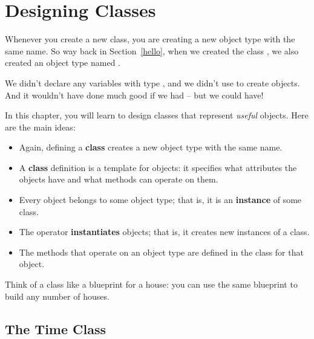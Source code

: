 \chapter{Designing Classes}


Whenever you create a new class, you are creating a new object type with the same name.
So way back in Section~\ref{hello}, when we created the class , we also created an object type named .

We didn't declare any variables with type , and we didn't use  to create  objects.
And it wouldn't have done much good if we had -- but we could have!

In this chapter, you will learn to design classes that represent {\em useful} objects.  Here are the main ideas:

\begin{itemize}

\item Again, defining a {\bf class} creates a new object type with the same name.


\item A {\bf class} definition is a template for objects: it specifies what attributes the objects have and what methods can operate on them.


\item Every object belongs to some object type; that is, it is an {\bf instance} of some class.


\item The  operator {\bf instantiates} objects; that is, it creates new instances of a class.


\item The methods that operate on an object type are defined in the class for that object.

\end{itemize}

Think of a class like a blueprint for a house: you can use the same blueprint to build any number of houses.

\section{The Time Class}

